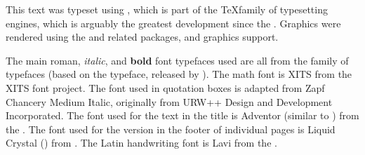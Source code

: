 ﻿%
This text was typeset using \hi{\XeLaTeX},
which is part of the \TeX family of typesetting engines, 
which is arguably the greatest development since the .
Graphics were rendered using the  and related packages, and \hi{\LaTeX} graphics support.

The main {\rmfamily roman}, {\itshape italic}, and {\bfseries bold} font typefaces used 
are all from the  family of typefaces
(based on the  typeface, released by ).
The math font is {{\fntXits XITS}} from the {{\fntXits XITS font project}}.
The font used in quotation boxes is adapted from {\fntZapf Zapf Chancery Medium Italic},
originally from URW++ Design and Development Incorporated.
The font used for the text in the title is {\fntAdventor Adventor} (similar to ) from the .
The font used for the version in the footer of individual pages is 
\mbox{\fntDigital\footnotesize Liquid} \mbox{\fntDigital\footnotesize Crystal} 
() from .
The Latin handwriting font is {\fntLavi Lavi} from the .





